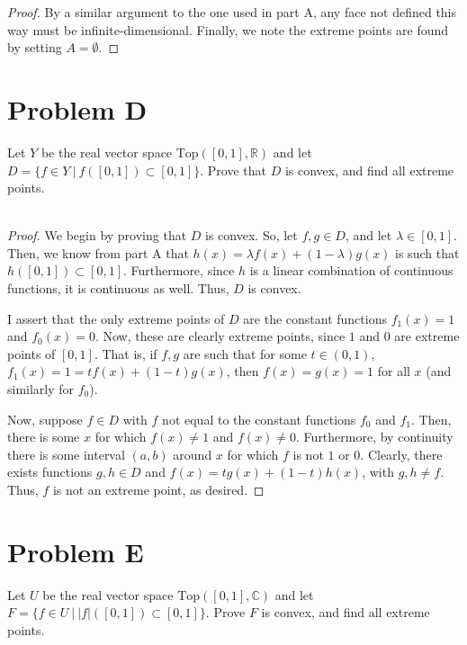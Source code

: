 \documentclass[fontsize=11pt]{scrartcl} %
\numberwithin{equation}{section} %
\numberwithin{figure}{section} %
\numberwithin{table}{section} %
\newcommand{\R}{\mathbb{R}}
\newcommand{\C}{\mathbb{C}}
\begin{document}
\begin{proof}
    By a similar argument to the one used in part A, any face not defined this
    way must be infinite-dimensional. Finally, we note the extreme points are
    found by setting $A=\emptyset$.
\end{proof}

\newpage

\section*{Problem D}
Let $Y$ be the real vector space $\text{Top}([0,1],\R)$ and let $D=\{f\in Y\ |\
f([0,1])\subset [0,1]\}$. Prove that $D$ is convex, and find all extreme
points.
\\
\\
\begin{proof}
    We begin by proving that $D$ is convex. So, let $f,g\in D$, and let
    $\lambda\in[0,1]$. Then, we know from part A that $h(x) = \lambda
    f(x)+(1-\lambda)g(x)$ is such that $h([0,1])\subset [0,1]$. Furthermore,
    since $h$ is a linear combination of continuous functions, it is continuous
    as well. Thus, $D$ is convex.

    I assert that the only extreme points of $D$ are the constant functions
    $f_1(x) = 1$ and $f_0(x) = 0$. Now, these are clearly extreme points, since
    $1$ and $0$ are extreme points of $[0,1]$. That is, if $f,g$ are such that
    for some $t\in (0,1)$, $f_1(x)=1 = tf(x) + (1-t)g(x)$, then $f(x) = g(x) =
    1$ for all $x$ (and similarly for $f_0$).

    Now, suppose $f\in D$ with $f$ not equal to the constant functions $f_0$ and
    $f_1$. Then, there is some $x$ for which $f(x)\neq 1$ and $f(x)\neq 0$.
    Furthermore, by continuity there is some interval $(a,b)$ around $x$ for
    which $f$ is not $1$ or $0$. Clearly, there exists functions $g,h\in D$
    and $f(x) = tg(x) + (1-t)h(x)$, with $g,h\neq f$. Thus, $f$ is not an
    extreme point, as desired.
\end{proof}

\newpage

\section*{Problem E}
Let $U$ be the real vector space $\text{Top}([0,1],\C)$ and let $F = \{f\in U\
|\ |f|([0,1])\subset [0,1]\}$. Prove $F$ is convex, and find all extreme points.
\end{document}
